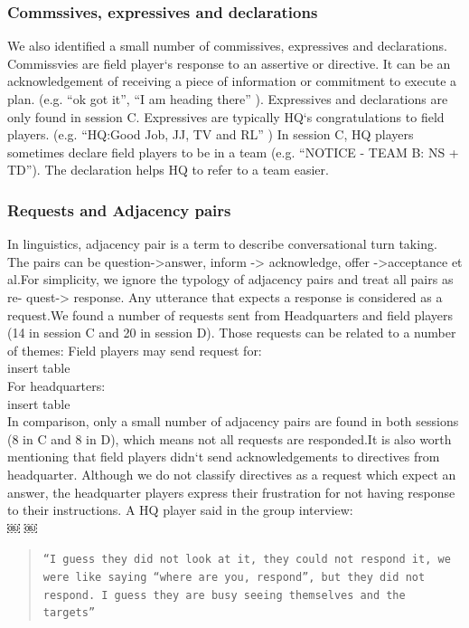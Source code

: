 \subsubsection{Commssives, expressives and declarations}
We also identified a small number of commissives, expressives and declarations. Commissvies are field player`s response to an assertive or directive. It can be an acknowledgement of receiving a piece of information or commitment to execute a plan. (e.g. ``ok got it'', ``I am heading there'' ). Expressives and declarations are only found in session C. Expressives are typically HQ`s congratulations to field players. (e.g. ``HQ:Good Job, JJ, TV and RL'' ) In session C, HQ players sometimes declare field players to be in a team (e.g. ``NOTICE - TEAM B: NS + TD''). The declaration helps HQ to refer to a team easier.\\

\subsubsection{Requests and Adjacency pairs}
In linguistics, adjacency pair is a term to describe conversational turn taking. The pairs can be question->answer, inform -> acknowledge, offer ->acceptance et al.For simplicity, we ignore the typology of adjacency pairs and treat all pairs as re- quest-> response. Any utterance that expects a response is considered as a request.We found a number of requests sent from Headquarters and field players (14 in session C and 20 in session D). Those requests can be related to a number of themes:
Field players may send request for: \\

insert table \\

For headquarters:\\

insert table \\


In comparison, only a small number of adjacency pairs are found in both sessions (8 in C and 8 in D), which means not all requests are responded.It is also worth mentioning that field players didn`t send acknowledgements to directives from headquarter. Although we do not classify directives as a request which expect an answer, the headquarter players express their frustration for not having response to their instructions. A HQ player said in the group interview:\\
￼
￼

\begin{quote}
\texttt{``I guess they did not look at it, they could not respond it, we were like saying ``where are you, respond'', but they did not respond. I guess they are busy seeing themselves and the targets''}
\end{quote}

